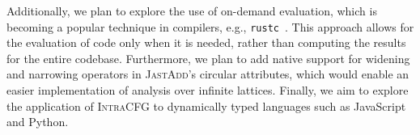 Additionally, we plan to explore the use of on-demand evaluation, which is becoming a popular
technique in compilers, e.g., \texttt{rustc}~\cite{Rust_Query_Guide}. This approach allows for the
evaluation of code only when it is needed, rather than computing the results for the entire codebase.
Furthermore, we plan to add native support for widening and narrowing
operators in \textsc{JastAdd}'s circular attributes, which would enable an easier implementation
of analysis over infinite lattices. Finally, we aim to explore the application of \textsc{IntraCFG} to
dynamically typed languages such as JavaScript and Python.